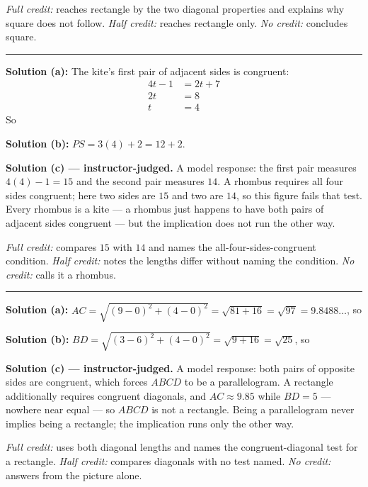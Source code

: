 \documentclass[12pt]{article}
\begin{document}
\emph{Full credit:} reaches rectangle by the two diagonal properties and explains why square does not follow. \emph{Half credit:} reaches rectangle only. \emph{No credit:} concludes square.

\vspace{0.2cm}\noindent\rule{\linewidth}{0.2pt}


\textbf{Solution (a):} The kite's first pair of adjacent sides is congruent:
\begin{align*}
  4t - 1 &= 2t + 7 \\
  2t &= 8 \\
  t &= 4
\end{align*}
So 

\textbf{Solution (b):} $PS = 3(4) + 2 = 12 + 2$. 

\textbf{Solution (c) --- instructor-judged.} A model response: the first pair measures $4(4) - 1 = 15$ and the second pair measures $14$. A rhombus requires all four sides congruent; here two sides are $15$ and two are $14$, so this figure fails that test. Every rhombus is a kite --- a rhombus just happens to have both pairs of adjacent sides congruent --- but the implication does not run the other way.

\emph{Full credit:} compares $15$ with $14$ and names the all-four-sides-congruent condition. \emph{Half credit:} notes the lengths differ without naming the condition. \emph{No credit:} calls it a rhombus.

\vspace{0.2cm}\noindent\rule{\linewidth}{0.2pt}


\textbf{Solution (a):} $AC = \sqrt{(9-0)^2 + (4-0)^2} = \sqrt{81 + 16} = \sqrt{97} = 9.8488\ldots$, so 

\textbf{Solution (b):} $BD = \sqrt{(3-6)^2 + (4-0)^2} = \sqrt{9 + 16} = \sqrt{25}$, so 

\textbf{Solution (c) --- instructor-judged.} A model response: both pairs of opposite sides are congruent, which forces $ABCD$ to be a parallelogram. A rectangle additionally requires congruent diagonals, and $AC \approx 9.85$ while $BD = 5$ --- nowhere near equal --- so $ABCD$ is not a rectangle. Being a parallelogram never implies being a rectangle; the implication runs only the other way.

\emph{Full credit:} uses both diagonal lengths and names the congruent-diagonal test for a rectangle. \emph{Half credit:} compares diagonals with no test named. \emph{No credit:} answers from the picture alone.
\end{document}
